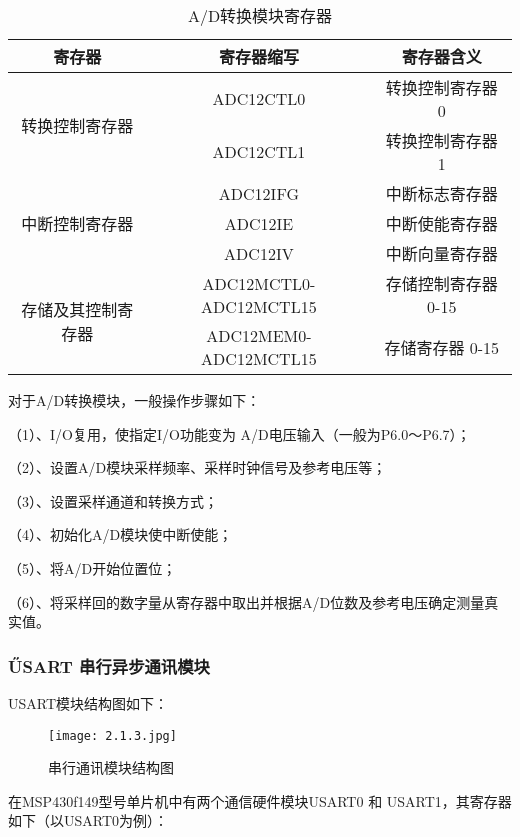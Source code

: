 \documentclass[12pt,a4paper]{article} %
\begin{document}
		
		
		
\begin{table}[h]
\caption{A/D转换模块寄存器}
			\begin{tabular}{|c|c|c|}
			\hline
		寄存器 & 寄存器缩写 & 寄存器含义  \\
		\hline
		\multirow{2}{*}{转换控制寄存器} & ADC12CTL0 & 转换控制寄存器 0 \\
		\cline{2-3}
		& ADC12CTL1 & 转换控制寄存器 1 \\
		\hline
		\multirow{3}{*}{中断控制寄存器} & ADC12IFG & 中断标志寄存器 \\
		
		\cline{2-3}
		& ADC12IE & 中断使能寄存器 \\
		\cline{2-3}
		& ADC12IV & 中断向量寄存器 \\
		\hline
		\multirow{2}{*}{存储及其控制寄存器} & ADC12MCTL0-ADC12MCTL15 & 存储控制寄存器 0-15 \\
		\cline{2-3}
		&ADC12MEM0-ADC12MCTL15 & 存储寄存器 0-15 \\
		\hline
\end{tabular}
\end{table}
	对于A/D转换模块，一般操作步骤如下：
	\par（1）、I/O复用，使指定I/O功能变为 A/D电压输入（一般为P6.0～P6.7）；
	 	\par （2）、设置A/D模块采样频率、采样时钟信号及参考电压等；
	 	\par （3）、设置采样通道和转换方式；
	 	\par （4）、初始化A/D模块使中断使能；
	 	\par （5）、将A/D开始位置位；
	 	\par （6）、将采样回的数字量从寄存器中取出并根据A/D位数及参考电压确定测量真实值。
		
			
					
	 	\subsubsection{\H USART 串行异步通讯模块} 
	 	USART模块结构图如下：
	 	\begin{figure}[H] %
 		  \centering
 		  \texttt{[image: 2.1.3.jpg]} 
  		  \caption{ 串行通讯模块结构图}
  		 \label{fig:2.1.3}
		\end{figure}
		在MSP430f149型号单片机中有两个通信硬件模块USART0 和 USART1，其寄存器如下（以USART0为例）：
		
\end{document}
